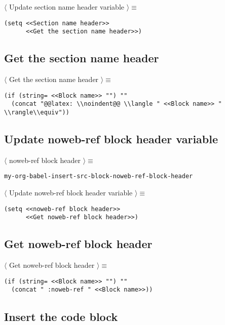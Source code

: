 \documentclass[11pt]{article}
\begin{document}
 \noindent \(\langle\) Update section name header variable \(\rangle \equiv\)
\begin{verbatim}
(setq <<Section name header>>
      <<Get the section name header>>)
\end{verbatim}

\subsection{Get the section name header}
\label{sec:org7daa13b}

 \noindent \(\langle\) Get the section name header \(\rangle \equiv\)
\begin{verbatim}
(if (string= <<Block name>> "") ""
  (concat "@@latex: \\noindent@@ \\langle " <<Block name>> " \\rangle\\equiv"))
\end{verbatim}

\subsection{Update noweb-ref block header variable}
\label{sec:org1a117e0}

 \noindent \(\langle\) noweb-ref block header \(\rangle \equiv\)
\begin{verbatim}
my-org-babel-insert-src-block-noweb-ref-block-header
\end{verbatim}

 \noindent \(\langle\) Update noweb-ref block header variable \(\rangle \equiv\)
\begin{verbatim}
(setq <<noweb-ref block header>>
      <<Get noweb-ref block header>>)
\end{verbatim}

\subsection{Get noweb-ref block header}
\label{sec:org2330e89}

 \noindent \(\langle\) Get noweb-ref block header \(\rangle \equiv\)
\begin{verbatim}
(if (string= <<Block name>> "") ""
  (concat " :noweb-ref " <<Block name>>))
\end{verbatim}

\subsection{Insert the code block}
\label{sec:org2641108}
\end{document}
